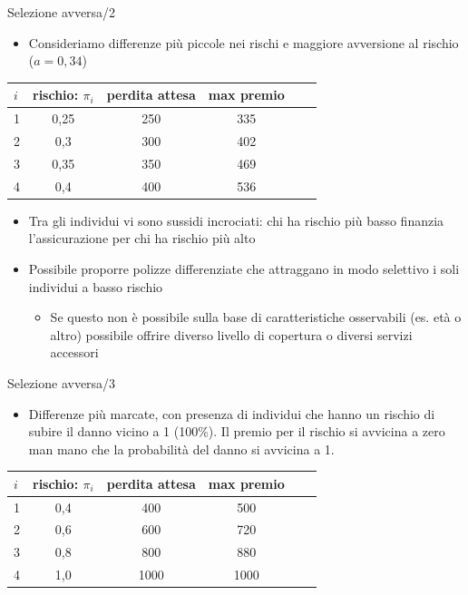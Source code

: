 \documentclass[aspectratio=64,12pt]{beamer}
\begin{document}
\begin{frame}{Selezione avversa/2}
\begin{itemize}
\item Consideriamo differenze più piccole nei rischi e maggiore avversione al rischio ($a=0,34$)
\end{itemize}

\begin{center}
\begin{tabular}{lccccl}
  \toprule
  $i$&rischio: $\pi_i$&perdita attesa& max premio\\
  \midrule
  1 & 0,25 &250 & 335 \\
  2 & 0,3 &300 & 402 \\
  3 & 0,35 &350 & 469 \\
  4 & 0,4 &400 & 536 \\
  \bottomrule
\end{tabular}
\end{center}

\begin{itemize}
\item Tra gli individui vi sono \alert{sussidi incrociati}: chi ha rischio più basso finanzia l'assicurazione per chi ha rischio più alto

\item Possibile proporre polizze differenziate che attraggano in modo selettivo i
soli individui a basso rischio
\begin{itemize}
\item Se questo non è possibile sulla base di caratteristiche osservabili (es. età
o altro) possibile offrire diverso livello di copertura o diversi servizi
accessori
\end{itemize}
\end{itemize}
\end{frame}

\begin{frame}{Selezione avversa/3}
\begin{itemize}
\item Differenze più marcate, con presenza di individui che hanno un rischio di subire il danno vicino a 1 (100\%). Il premio per il rischio si avvicina a zero man mano che la probabilità del danno si avvicina a 1.
\end{itemize}

\begin{center}
\begin{tabular}{lccccl}
  \toprule
  $i$&rischio: $\pi_i$&perdita attesa & max premio\\
  \midrule
  1 & 0,4 &400 & 500 \\
  2 & 0,6 &600 & 720 \\
  3 & 0,8 &800 & 880 \\
  4 & 1,0 &1000&1000 \\
  \bottomrule
\end{tabular}
\end{center}
\end{frame}
\end{document}
